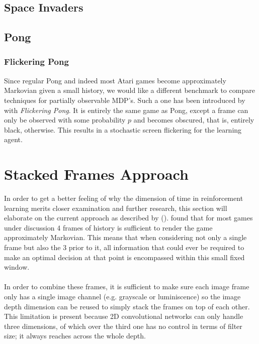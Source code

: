 \subsection{Space Invaders}
\label{sub:space_invaders}

\subsection{Pong}
\label{sub:pong}

\subsubsection{Flickering Pong}
Since regular Pong and indeed most Atari games
become approximately Markovian
given a small history,
we would like a different benchmark
to compare techniques
for partially observable MDP's.
Such a one has been introduced by \citeauthor{Hausknecht2015}
with \textit{Flickering Pong}.
It is entirely the same game as Pong,
except a frame can only be observed with some probability $p$
and becomes obscured, that is, entirely black, otherwise.
This results in a stochastic screen flickering for the learning agent.

\paragraph{}

\section{Stacked Frames Approach}
\label{sec:stacked_frames_approach}
In order to get a better feeling
of why the dimension of time in reinforcement learning
merits closer examination and further research,
this section will elaborate on the current approach
as described by
\citeauthor{Mnih2013} (\citeyear{Mnih2013}).
\citeauthor{Mnih2013}
found that for most games under discussion
4 frames of history is sufficient to render the game approximately Markovian.
This means that when considering not only a single frame
but also the 3 prior to it,
all information that could ever be required to make an optimal decision
at that point is encompassed within this small fixed window.

\paragraph{}
In order to combine these frames,
it is sufficient to make sure each image frame only has a single image channel
(e.g. grayscale or luminiscence)
so the image depth dimension can be reused
to simply stack the frames on top of each other.
This limitation is present because 2D convolutional networks
can only handle three dimensions,
of which over the third one has no control in terms of filter size;
it always reaches across the whole depth.

